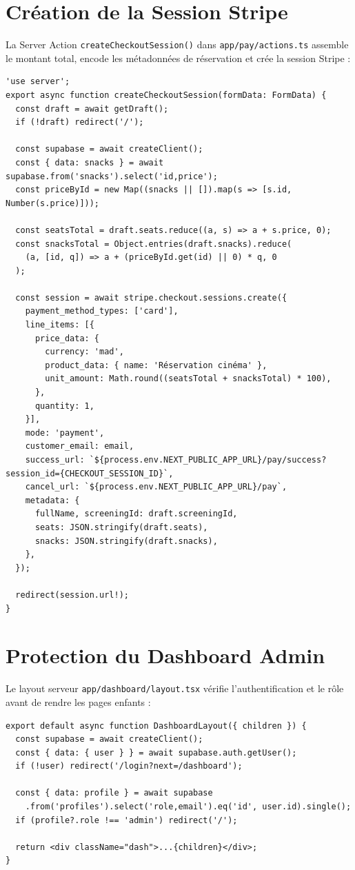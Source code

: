 \documentclass[12pt,a4paper,openany]{report}
\begin{document}
\section{Création de la Session Stripe}

La Server Action \texttt{createCheckoutSession()} dans \texttt{app/pay/actions.ts} assemble le montant total, encode les métadonnées de réservation et crée la session Stripe :

\begin{lstlisting}
'use server';
export async function createCheckoutSession(formData: FormData) {
  const draft = await getDraft();
  if (!draft) redirect('/');

  const supabase = await createClient();
  const { data: snacks } = await supabase.from('snacks').select('id,price');
  const priceById = new Map((snacks || []).map(s => [s.id, Number(s.price)]));

  const seatsTotal = draft.seats.reduce((a, s) => a + s.price, 0);
  const snacksTotal = Object.entries(draft.snacks).reduce(
    (a, [id, q]) => a + (priceById.get(id) || 0) * q, 0
  );

  const session = await stripe.checkout.sessions.create({
    payment_method_types: ['card'],
    line_items: [{
      price_data: {
        currency: 'mad',
        product_data: { name: 'Réservation cinéma' },
        unit_amount: Math.round((seatsTotal + snacksTotal) * 100),
      },
      quantity: 1,
    }],
    mode: 'payment',
    customer_email: email,
    success_url: `${process.env.NEXT_PUBLIC_APP_URL}/pay/success?session_id={CHECKOUT_SESSION_ID}`,
    cancel_url: `${process.env.NEXT_PUBLIC_APP_URL}/pay`,
    metadata: {
      fullName, screeningId: draft.screeningId,
      seats: JSON.stringify(draft.seats),
      snacks: JSON.stringify(draft.snacks),
    },
  });

  redirect(session.url!);
}
\end{lstlisting}

\section{Protection du Dashboard Admin}

Le layout serveur \texttt{app/dashboard/layout.tsx} vérifie l'authentification et le rôle avant de rendre les pages enfants :

\begin{lstlisting}
export default async function DashboardLayout({ children }) {
  const supabase = await createClient();
  const { data: { user } } = await supabase.auth.getUser();
  if (!user) redirect('/login?next=/dashboard');

  const { data: profile } = await supabase
    .from('profiles').select('role,email').eq('id', user.id).single();
  if (profile?.role !== 'admin') redirect('/');

  return <div className="dash">...{children}</div>;
}
\end{lstlisting}
\end{document}
